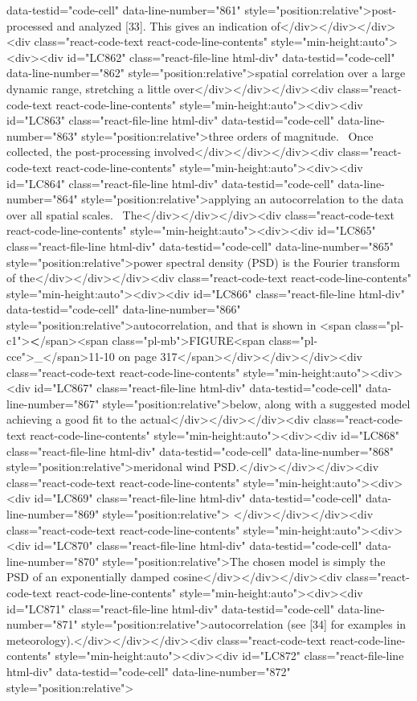 {{{{{{data-testid="code-cell" data-line-number="861" style="position:relative">post-processed and analyzed {[}33{]}. This gives an indication of</div></div></div><div class="react-code-text react-code-line-contents" style="min-height:auto"><div><div id="LC862" class="react-file-line html-div" data-testid="code-cell" data-line-number="862" style="position:relative">spatial correlation over a large dynamic range, stretching a little over</div></div></div><div class="react-code-text react-code-line-contents" style="min-height:auto"><div><div id="LC863" class="react-file-line html-div" data-testid="code-cell" data-line-number="863" style="position:relative">three orders of magnitude.~ Once collected, the post-processing involved</div></div></div><div class="react-code-text react-code-line-contents" style="min-height:auto"><div><div id="LC864" class="react-file-line html-div" data-testid="code-cell" data-line-number="864" style="position:relative">applying an autocorrelation to the data over all spatial scales.~ The</div></div></div><div class="react-code-text react-code-line-contents" style="min-height:auto"><div><div id="LC865" class="react-file-line html-div" data-testid="code-cell" data-line-number="865" style="position:relative">power spectral density (PSD) is the Fourier transform of the</div></div></div><div class="react-code-text react-code-line-contents" style="min-height:auto"><div><div id="LC866" class="react-file-line html-div" data-testid="code-cell" data-line-number="866" style="position:relative">autocorrelation, and that is shown in <span class="pl-c1">\textbf</span>{<span class="pl-mb">FIGURE<span class="pl-cce">\_</span>11-10 on page 317</span>}</div></div></div><div class="react-code-text react-code-line-contents" style="min-height:auto"><div><div id="LC867" class="react-file-line html-div" data-testid="code-cell" data-line-number="867" style="position:relative">below, along with a suggested model achieving a good fit to the actual</div></div></div><div class="react-code-text react-code-line-contents" style="min-height:auto"><div><div id="LC868" class="react-file-line html-div" data-testid="code-cell" data-line-number="868" style="position:relative">meridonal wind PSD.</div></div></div><div class="react-code-text react-code-line-contents" style="min-height:auto"><div><div id="LC869" class="react-file-line html-div" data-testid="code-cell" data-line-number="869" style="position:relative">
</div></div></div><div class="react-code-text react-code-line-contents" style="min-height:auto"><div><div id="LC870" class="react-file-line html-div" data-testid="code-cell" data-line-number="870" style="position:relative">The chosen model is simply the PSD of an exponentially damped cosine</div></div></div><div class="react-code-text react-code-line-contents" style="min-height:auto"><div><div id="LC871" class="react-file-line html-div" data-testid="code-cell" data-line-number="871" style="position:relative">autocorrelation (see {[}34{]} for examples in meteorology).</div></div></div><div class="react-code-text react-code-line-contents" style="min-height:auto"><div><div id="LC872" class="react-file-line html-div" data-testid="code-cell" data-line-number="872" style="position:relative">
}}}}}}
